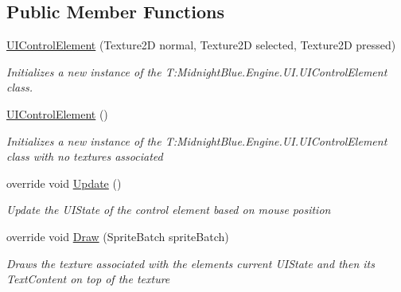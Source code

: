\subsection*{Public Member Functions}
\begin{DoxyCompactItemize}
\item 
\hyperlink{class_midnight_blue_1_1_engine_1_1_u_i_1_1_u_i_control_element_aa154266887b21e568194ca4e25068793}{U\+I\+Control\+Element} (Texture2D normal, Texture2D selected, Texture2D pressed)
\begin{DoxyCompactList}\small\item\em Initializes a new instance of the T\+:\+Midnight\+Blue.\+Engine.\+U\+I.\+U\+I\+Control\+Element class. \end{DoxyCompactList}\item 
\hyperlink{class_midnight_blue_1_1_engine_1_1_u_i_1_1_u_i_control_element_ac4d28afdc718453c0499bf34689ec10f}{U\+I\+Control\+Element} ()
\begin{DoxyCompactList}\small\item\em Initializes a new instance of the T\+:\+Midnight\+Blue.\+Engine.\+U\+I.\+U\+I\+Control\+Element class with no textures associated \end{DoxyCompactList}\item 
override void \hyperlink{class_midnight_blue_1_1_engine_1_1_u_i_1_1_u_i_control_element_a646726d45236a7b770493f987a8ef1d2}{Update} ()
\begin{DoxyCompactList}\small\item\em Update the U\+I\+State of the control element based on mouse position \end{DoxyCompactList}\item 
override void \hyperlink{class_midnight_blue_1_1_engine_1_1_u_i_1_1_u_i_control_element_ab279864be71adda238d2a54648ae237e}{Draw} (Sprite\+Batch sprite\+Batch)
\begin{DoxyCompactList}\small\item\em Draws the texture associated with the elements current U\+I\+State and then its Text\+Content on top of the texture \end{DoxyCompactList}\end{DoxyCompactItemize}
